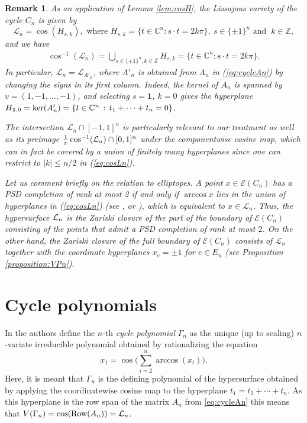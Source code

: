 \documentclass[a4paper, 11pt, twoside]{article}
\newcommand{\C}{\mathbb{C}}
\newcommand{\ME}{{\mathcal E}}
\newcommand{\Row}{{\text{\rm Row}}}
\newcommand{\ML}{{\mathcal L}}
\newcommand{\Z}{\mathbb Z}
\newcommand{\ao}{\mathbf {1}}
\theoremstyle{plain}
\newtheorem{remark}[theorem]{Remark}
\begin{document}
\begin{remark}\label{rem:cosLn}  
As an application of Lemma \ref{lem:cosH}, the Lissajous variety of the cycle  $C_n$ is given by
\[
\ML_n=\cos(H_{s,k}), \text{ where } H_{s,k} = \Big\{t\in \C^n: s\cdot t=2k\pi \Big\},\  s\in\{ \pm 1\}^n \text{ and } \ k\in \Z,
\]
and we have 
\begin{align}\label{eq:cosLn}
 \cos^{-1}(\ML_n)=\bigcup_{s\in\{\pm 1\}^n,k\in\Z}H_{s,k}=\{t\in \C^n: s\cdot t=2k\pi \}.
\end{align}
In particular, $\ML_n=\ML_{A'_n}$, where $A'_n$ is obtained from $A_n$ in (\ref{eq:cycleAn}) by changing the signs in its first column.
Indeed, the kernel of $A_n$ is spanned by $v=(1,-1,\ldots,-1)$, and  selecting $s=\ao$, $k=0$ gives the hyperplane  $H_{{\bf 1},0} =\ker (A'_n) = \{ t \in \mathbb{C}^n\, : \, t_1 + \cdots + t_n = 0 \}$.

The intersection $ \ML_n\cap [-1,1]^n$ is particularly relevant to our treatment as well as its preimage ${1\over \pi}\cos^{-1}(\ML_n)\cap [0,1]^n$ under the componentwise cosine map, which can in fact be covered by a union of {\em finitely many} hyperplanes since one can restrict  to $|k|\le n/2$ in (\ref{eq:cosLn}).

Let us comment briefly on the relation to elliptopes. A point $x\in\ME(C_n)$ has a PSD completion of rank at most 2 
if and only if $\arccos x$ lies in the   union of hyperplanes in  (\ref{eq:cosLn}) (see \cite[Section 2.2]{NLV-Fields}, or \cite[Lemma 4.6]{BS-2020}), which is equivalent to $x\in \ML_n$.  Thus, the hypersurface ${\cal L}_n$ is the Zariski closure of the part of the boundary of $\ME(C_n)$ consisting of the points that admit a PSD completion of rank at most $2$. On the other hand,  the Zariski closure of the full boundary of $\ME(C_n)$ consists of $\ML_n$ together with the coordinate 
hyperplanes $x_e=\pm 1$ for $e\in E_n$ (see Proposition \ref{proposition:VPn}).
\end{remark}

\section{Cycle polynomials}\label{sec:cyclepolynomial}

In \cite[Section 4.2]{Sturmfels2010MultivariateGaussians} the authors define the $n$-th \emph{cycle polynomial} $\Gamma_n$ as the unique (up to scaling) $n$-variate irreducible polynomial obtained by rationalizing the equation
\begin{equation} \label{eq:rationalized equation}
    x_1 = \cos\Big(\sum_{i=2}^n \arccos(x_i)\Big).
\end{equation}
Here, it is meant that $\Gamma_n$ is the defining polynomial of the hypersurface obtained by applying the coordinatewise cosine map to the hyperplane $t_1 = t_2 + \cdots + t_n$. As this hyperplane is the row span of the matrix $A_n$ from \eqref{eq:cycleAn} this means  that  $V(\Gamma_n)=\cos(\Row(A_n))=\ML_n$.
\end{document}
